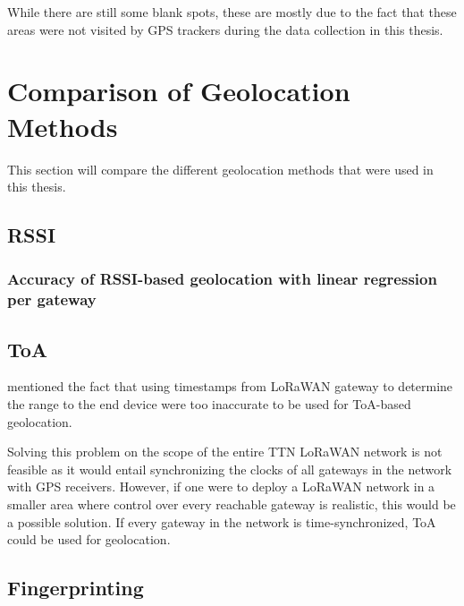 While there are still some blank spots, these are mostly due to the fact that these areas were not visited by \ac{GPS} trackers during the data collection in this thesis.

\section{Comparison of Geolocation Methods}

This section will compare the different geolocation methods that were used in this thesis.

\subsection{\acf{RSSI}}


\subsubsection{Accuracy of \acs{RSSI}-based geolocation with linear regression per gateway}\label{subsubsec:conclusion-rssi-linear-regression}

\subsection{\acf{ToA}}\label{subsec:conclusion-toa-tdoa}

 mentioned the fact that using timestamps from \ac{LoRaWAN} gateway to determine the range to the end device were too inaccurate to be used for \ac{ToA}-based geolocation.

Solving this problem on the scope of the entire \ac{TTN} \ac{LoRaWAN} network is not feasible as it would entail synchronizing the clocks of all gateways in the network with \ac{GPS} receivers.
However, if one were to deploy a \ac{LoRaWAN} network in a smaller area where control over every reachable gateway is realistic, this would be a possible solution.
If every gateway in the network is time-synchronized, \ac{ToA} could be used for geolocation.


\subsection{Fingerprinting}

